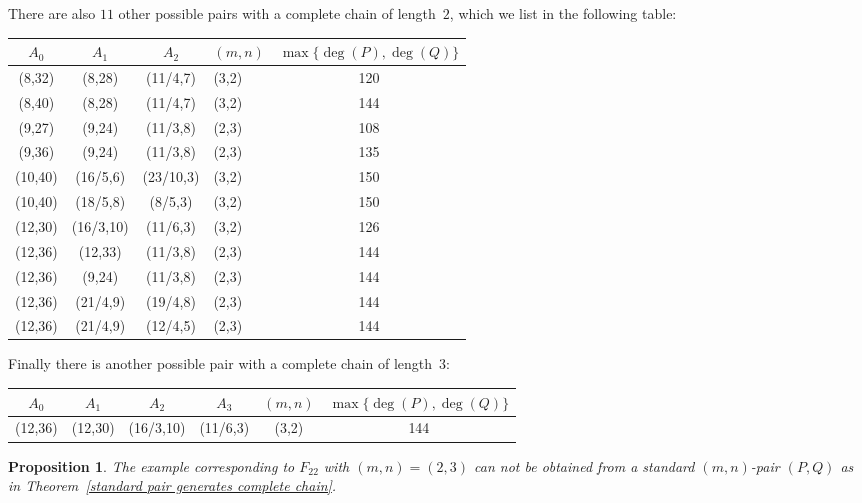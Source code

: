 \documentclass[reqno,a4paper,twoside]{amsart}
\newcommand{\ra}[1]{\renewcommand{\arraystretch}{#1}}
\newtheorem{proposition}[theorem]{Proposition}
\theoremstyle{definition}
\theoremstyle{remark}
\begin{document}
There are also $11$ other possible pairs with a complete chain of length~$2$, which we list in the following table:
\begin{center}
\ra{1.2}
\begin{tabular}[t]{ccclc}
\toprule
$A_0$ & $A_1$&$A_2$& $(m,n)$ & $\max\{\deg(P),\deg(Q)\}$ \\
\midrule
              (8,32)&(8,28) & (11/4,7) & 	 (3,2)&120 \\
               (8,40)&(8,28) &(11/4,7) & 	 (3,2)&144 \\
              (9,27) & (9,24) & (11/3,8)&	 (2,3)&108\\
              (9,36) & (9,24) & (11/3,8) &   (2,3)&135 \\
              (10,40) & (16/5,6) & (23/10,3) & 	 (3,2)& 150\\
               (10,40)& (18/5,8) &(8/5,3) &	 (3,2)&150\\
             (12,30)&(16/3,10) & (11/6,3) &  	 (3,2)&126 \\
             (12,36) & (12,33) & (11/3,8) &	 (2,3)&144\\
             (12,36) & (9,24) & (11/3,8) &	 (2,3)&144\\
(12,36)&(21/4,9) & (19/4,8) & 	 (2,3)&144\\
 (12,36)&(21/4,9) &(12/4,5) & 	 (2,3)&144\\
\bottomrule
\end{tabular}
\end{center}

Finally there is another possible pair with a complete chain of length~$3$:
\begin{center}
\begin{tabular}[t]{cccccc}
\toprule
 $A_0$ & $A_1$&$A_2$& $A_3$ & $(m,n)$ & $\max\{\deg(P),\deg(Q)\}$ \\
\midrule
              (12,36)&(12,30) & (16/3,10) & (11/6,3)&	 (3,2)&144 \\
\bottomrule
\end{tabular}
\end{center}

\begin{proposition}\label{caso antisimetrico} The example corresponding to $F_{22}$ with $(m,n)=(2,3)$ can not be obtained from a standard $(m,n)$-pair $(P,Q)$ as in Theorem~\ref{standard pair generates complete chain}.
\end{proposition}
\end{document}
